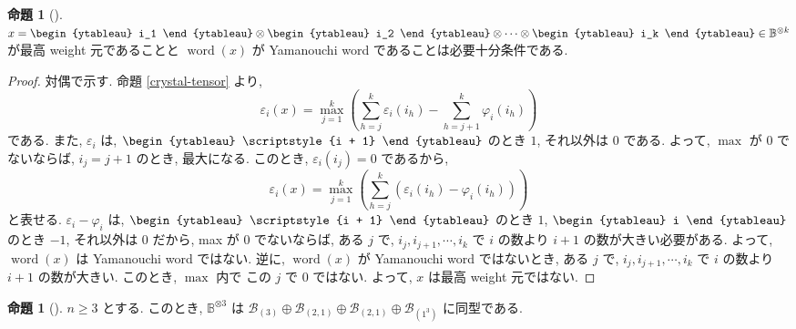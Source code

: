 \documentclass[
  a4paper, 
  12pt,
  ja=standard,
  xelatex,
  left=30truemm,
  right=30truemm,
  titlepage 
]{bxjsarticle}
\theoremstyle{definition}
\newtheorem{prop}[thm]{命題}
\begin{document}
\begin{prop} [{\cite[命題8.2]{b2}}]
  $x =     
  \begin{ytableau} i_1 \end{ytableau} \otimes 
  \begin{ytableau} i_2 \end{ytableau} \otimes 
  \cdots \otimes 
  \begin{ytableau} i_k \end{ytableau}
  \in \mathbb{B}^{ \otimes k}
  $ 
  が最高 weight 元であることと $\operatorname{word}(x)$ が Yamanouchi word
  であることは必要十分条件である.
\end{prop}

\begin{proof}
  対偶で示す. 命題 \ref{crystal-tensor} より,
  $$
  \varepsilon_i(x) = \max_{j = 1}^{k} \left( \sum_{h = j}^{k} \varepsilon_i(i_h) - \sum_{h = j + 1}^{k} \varphi_i(i_h) \right)
  $$
  である.
  また, $\varepsilon_i$ は, ${\begin{ytableau} \scriptstyle{i + 1} \end{ytableau}}$ のとき $1$, それ以外は $0$ である.
  よって, $\max$ が $0$ でないならば, $i_j = j + 1$ のとき, 最大になる. このとき, $\varepsilon_i(i_j) = 0$ であるから,
  $$\varepsilon_i(x) = \max_{j = 1}^{k}\left(  \sum_{h = j}^{k} (\varepsilon_i(i_h) - \varphi_i(i_h)) \right)$$
  と表せる. $\varepsilon_i - \varphi_i$ は, ${\begin{ytableau} \scriptstyle{i + 1} \end{ytableau}}$ のとき $1$, 
  ${\begin{ytableau} i \end{ytableau}}$ のとき $-1$, それ以外は $0$ だから, max が $0$ でないならば, ある $j$ で, 
  ${i_j, i_{j + 1}, \cdots, i_k}$ で $i$ の数より $i + 1$ の数が大きい必要がある. よって, $\operatorname{word}(x)$
  は Yamanouchi word ではない. 逆に,  $\operatorname{word}(x)$ が Yamanouchi word ではないとき, ある $j$ で, 
  ${i_j, i_{j + 1}, \cdots, i_k}$ で $i$ の数より $i + 1$ の数が大きい. このとき, $\max$ 内で この $j$ で $0$ ではない.
  よって, $x$ は最高 weight 元ではない.
\end{proof}

\begin{prop} [{\cite[命題8.3]{b2}}]
  $n \geq 3$ とする.
  このとき, $\mathbb{B}^{ \otimes 3}$ は $\mathcal{B}_{(3)} \oplus \mathcal{B}_{(2, 1)} \oplus \mathcal{B}_{(2, 1)} \oplus \mathcal{B}_{(1^3)}$ 
  に同型である.
\end{prop}
\end{document}
